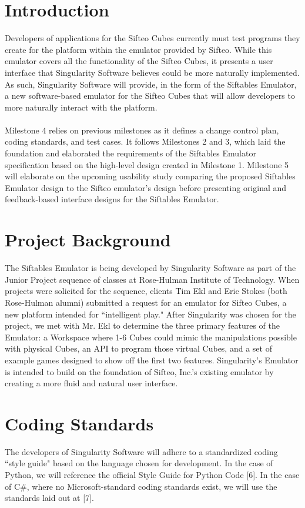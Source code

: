 \documentclass[12pt]{article}
\begin{document}
\section{Introduction}
Developers of applications for the \gls{Sifteo Cubes} currently must test programs they create for the platform within the emulator provided by Sifteo. While this emulator covers all  the functionality of the Sifteo Cubes, it presents a user interface that Singularity Software believes could be more naturally implemented. As such, Singularity Software will provide, in the form of the Siftables Emulator, a new software-based emulator for the Sifteo Cubes that will allow developers to more naturally interact with the platform.\\\\
Milestone 4 relies on previous milestones as it defines a change control plan, coding standards, and test cases. It follows Milestones 2 and 3, which laid the foundation and elaborated the requirements of the Siftables Emulator specification based on the high-level design created in Milestone 1. Milestone 5 will elaborate on the upcoming usability study comparing the proposed Siftables Emulator design to the Sifteo emulator's design before presenting original and feedback-based interface designs for the Siftables Emulator.

\section{Project Background}
The Siftables Emulator is being developed by Singularity Software as part of the Junior Project sequence of classes at Rose-Hulman Institute of Technology. When projects were solicited for the sequence, clients Tim Ekl and Eric Stokes (both Rose-Hulman alumni) submitted a request for an emulator for Sifteo Cubes, a new platform intended for ``intelligent play." After Singularity was chosen for the project, we met with Mr. Ekl to determine the three primary features of the Emulator: a Workspace where 1-6 Cubes could mimic the manipulations possible with physical Cubes, an \gls{API} to program those virtual Cubes, and a set of example games designed to show off the first two features. Singularity's Emulator is intended to build on the foundation of Sifteo, Inc.'s existing emulator by creating a more fluid and natural user interface.

\section{Coding Standards}
The developers of Singularity Software will adhere to a standardized coding ``style guide" based on the language chosen for development. In the case of Python, we will reference the official Style Guide for Python Code [6]. In the case of C\#, where no Microsoft-standard coding standards exist, we will use the standards laid out at [7].
\end{document}
